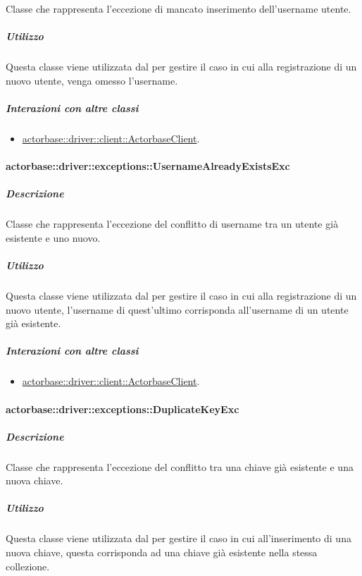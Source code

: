\documentclass{scalatekids-article}
\begin{document}
Classe che rappresenta l'eccezione di mancato inserimento dell'username utente.

\subparagraph{Utilizzo}

Questa classe viene utilizzata dal  per gestire il caso in cui alla registrazione di un nuovo utente, venga omesso l'username.

\subparagraph{Interazioni con altre classi}

\begin{itemize}
\item \hyperref[sec:actorbase::driver::client::ActorbaseClient]{actorbase::driver::client::ActorbaseClient}.
\end{itemize}

\paragraph{actorbase::driver::exceptions::UsernameAlreadyExistsExc}

\subparagraph{Descrizione}

Classe che rappresenta l'eccezione del conflitto di username tra un utente già esistente e uno nuovo.

\subparagraph{Utilizzo}

Questa classe viene utilizzata dal  per gestire il caso in cui alla registrazione di un nuovo utente, l'username di quest'ultimo corrisponda all'username di un utente già esistente.

\subparagraph{Interazioni con altre classi}

\begin{itemize}
\item \hyperref[sec:actorbase::driver::client::ActorbaseClient]{actorbase::driver::client::ActorbaseClient}.
\end{itemize}

\paragraph{actorbase::driver::exceptions::DuplicateKeyExc}

\subparagraph{Descrizione}

Classe che rappresenta l'eccezione del conflitto tra una chiave già esistente e una nuova chiave.

\subparagraph{Utilizzo}

Questa classe viene utilizzata dal  per gestire il caso in cui all'inserimento di una nuova chiave, questa corrisponda ad una chiave già esistente nella stessa collezione.
\end{document}
